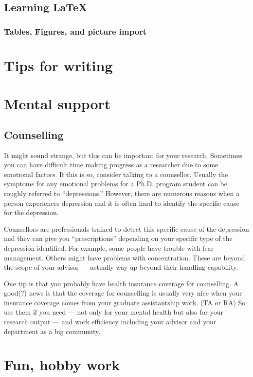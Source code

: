 \documentclass[11pt]{article}
\begin{document}
\subsection{Learning LaTeX}

\subsubsection{Tables, Figures, and picture import}


\section{Tips for writing}



\section{Mental support}

\subsection{Counselling}
It might sound strange, but this can be important for your research.
Sometimes you can have difficult time making progress as a researcher due to
some emotional factors. If this is so, consider talking to a counsellor.
Usually the symptoms for any emotional problems for a Ph.D.  program student
can be roughly referred to ``depressions.'' However, there are numerous
reasons when a person experiences depression and it is often hard to identify
the specific cause for the depression.

Counsellors are professionals trained to detect this specific cause of the
depression and they can give you ``prescriptions'' depending on your specific
type of the depression identified. For example, some people have trouble with
fear management. Others might have problems with concentration. These are
beyond the scope of your advisor --- actually way up beyond their handling
capability.

One tip is that you probably have health insurance coverage for counselling. A
good(?) news is that the coverage for counselling is usually very nice when
your insurance coverage comes from your graduate assistantship work. (TA or
RA) So use them if you need --- not only for your mental health but also for
your research output --- and work efficiency including your advisor and
your department as a big community.

\section{Fun, hobby work}
\end{document}
